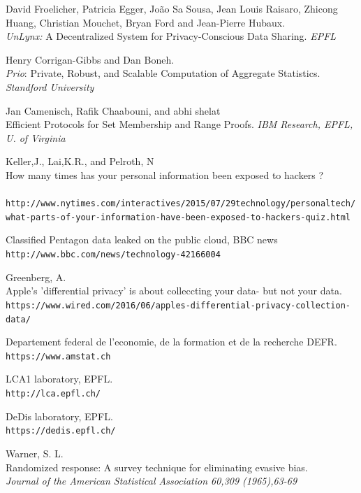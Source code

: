 \documentclass{article}
\begin{document}
\newpage
\begin{thebibliography}{9}

David Froelicher, Patricia Egger, João Sa Sousa, Jean Louis Raisaro, Zhicong Huang, Christian Mouchet, Bryan Ford and Jean-Pierre Hubaux.\\
\textit{UnLynx:} A Decentralized System for Privacy-Conscious Data Sharing. 
\textit{EPFL}
 
Henry Corrigan-Gibbs and Dan Boneh.\\
\textit{Prio}: Private, Robust, and Scalable Computation of Aggregate Statistics.
\textit{Standford University}


Jan Camenisch, Rafik Chaabouni, and abhi shelat\\
Efficient Protocols for Set Membership and Range Proofs.
\textit{IBM Research, EPFL, U. of Virginia}

Keller,J., Lai,K.R., and Pelroth, N\\
How many times has your personal information been exposed to hackers ?\\
\\\texttt{http://www.nytimes.com/interactives/2015/07/29technology/personaltech/what-parts-of-your-information-have-been-exposed-to-hackers-quiz.html}

Classified Pentagon data leaked on the public cloud, BBC news
\\\texttt{http://www.bbc.com/news/technology-42166004}

Greenberg, A.\\
Apple's 'differential privacy' is about colleccting your data- but not your data.
\\\texttt{https://www.wired.com/2016/06/apples-differential-privacy-collection-data/}

Departement federal de l'economie, de la formation et de la recherche DEFR.
\\\texttt{https://www.amstat.ch}

LCA1 laboratory, EPFL.
\\\texttt{http://lca.epfl.ch/}

DeDis laboratory, EPFL.
\\\texttt{https://dedis.epfl.ch/}

Warner, S. L.\\
Randomized response: A survey technique for eliminating evasive bias.\\
\textit{Journal of the American Statistical Association 60,309 (1965),63-69}


\end{thebibliography}
\end{document}

